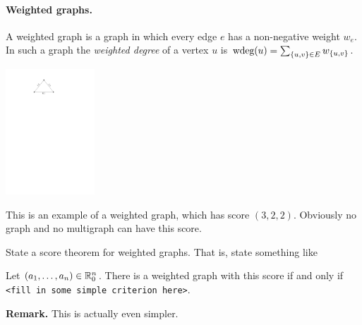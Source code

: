 \documentclass[12pt,a4]{article}
\begin{document}
\newcommand{\wdeg}{\textnormal{wdeg}}

\paragraph{Weighted graphs.} A weighted graph is a graph in which every edge $e$ has a non-negative weight $w_e$.
In such a graph the {\em weighted degree} of a vertex $u$ is $\wdeg(u) = \sum_{ \{u,v\} \in E} w_{\{u,v\}}$.

\begin{center}
  \includegraphics[width=0.25\textwidth]{figures/weighted-graph-score.pdf}
\end{center}

This is an example of a weighted graph, which has score $(3,2,2)$. Obviously no graph
and no multigraph can have this score.

\begin{exercise}
  State a score theorem for weighted graphs. That is, state something like
  \begin{theorem}
     Let $(a_1,\dots,a_n) \in \mathbb{R}_0^n$. There is a weighted graph
     with this score if and only if \texttt{\textup{<fill in some simple criterion here>}}.
  \end{theorem}
  \textbf{Remark.} This
  is actually even simpler.
\end{exercise}
\end{document}
